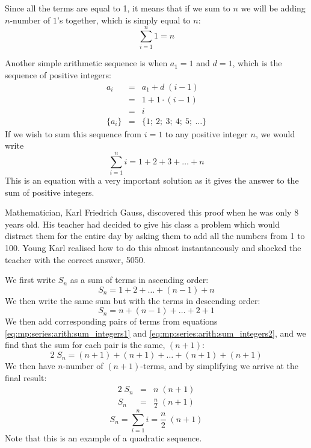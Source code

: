 Since all the terms are equal to 1, it means that if we sum to $n$ we will be adding $n$-number of $1$'s together, which is simply equal to $n$:
\begin{equation}
\boxed{\sum_{i=1}^n 1 = n}
\end{equation}

Another simple arithmetic sequence is when $a_1=1$ and $d=1$, which is the sequence of positive integers:
\begin{eqnarray*}
a_i &=& a_1 + d \; (i - 1) \\
&=& 1 + 1 \cdot (i - 1) \\
&=& i \\
\{a_i\} &=& \{1; \: 2; \: 3; \: 4; \: 5; \: \ldots \}
\end{eqnarray*}
If we wish to sum this sequence from $i=1$ to any positive integer $n$, we would write
\begin{equation}
\label{eq:mp:se:fa:simple:sum1}
\sum_{i=1}^n i = 1 + 2 + 3 + \ldots + n
\end{equation}
This is an equation with a very important solution as it gives the answer to the sum of positive integers.

\begin{IFact}{Mathematician, Karl Friedrich Gauss, discovered this proof when he was only 8 years old. His teacher had decided to give his class a problem which would distract them for the entire day by asking them to add all the numbers from 1 to 100. Young Karl realised how to do this almost instantaneously and shocked the teacher with the correct answer, 5050.}
\end{IFact}

We first write $S_n$ as a sum of terms in ascending order:
\begin{equation}
\label{eq:mp:series:arith:sum_integers1}
S_n = 1 + 2 + \ldots + (n - 1) + n
\end{equation}
\noindent
We then write the same sum but with the terms in descending order:
\begin{equation}
\label{eq:mp:series:arith:sum_integers2}
S_n = n + (n-1) + \ldots + 2 + 1
\end{equation}
We then add corresponding pairs of terms from equations \eqref{eq:mp:series:arith:sum_integers1} and \eqref{eq:mp:series:arith:sum_integers2}, and we find that the sum for each pair is the same, $(n+1)$:
\begin{equation}
2 \; S_n = (n+1) + (n+1) + \ldots + (n+1) + (n+1)
\end{equation}
We then have $n$-number of $(n+1)$-terms, and by simplifying we arrive at the final result:
\begin{eqnarray*}
2 \; S_n &=& n \; (n + 1) \\
S_n &=& \frac {n}{2} \; (n + 1)
\end{eqnarray*}
\begin{equation}
\label{eq:mp:series:sum_integers}
\boxed{S_n = \sum_{i=1}^n i = \frac {n}{2} \; (n + 1)}
\end{equation}
Note that this is an example of a quadratic sequence.

